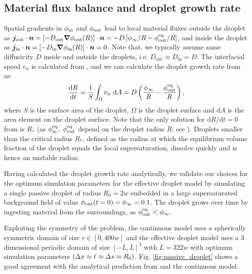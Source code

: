 \subsection{Material flux balance and droplet growth rate}

Spatial gradients in $\phi_\mathrm{in}$ and $\phi_\mathrm{out}$ lead to local material fluxes outside the droplet as $\boldsymbol{j}_\mathrm{out} \cdot \boldsymbol{n} = [-D_\mathrm{out} {\boldsymbol{\nabla}} \phi_\mathrm{out} (R)] \cdot \boldsymbol{n} = -D \left[ \phi_{\infty}/R  - \phi^\mathrm{eq}_\mathrm{out} / R \right]$, and inside the droplet as $\boldsymbol{j}_\mathrm{in} \cdot \boldsymbol{n} = [-D_\mathrm{in} {\boldsymbol{\nabla}} \phi_\mathrm{in} (R)] \cdot \boldsymbol{n} = 0$.
Note that, we typically assume same diffusivity $D$ inside and outside the droplets, i.e. $D_\mathrm{out} \approx D_\mathrm{in} = D$.
The interfacial speed $v_n$ is calculated from
, and we can calculate the droplet growth rate from  as:
\begin{equation}
	\label{eqn:interfacefluxes_passive}
	\frac{\mathrm{d} R}{\mathrm{d} t} = \frac{1}{S} \int_{\Omega} v_n ~ \mathrm{d}A = D\left ( \frac{\phi_{\infty}}{R}  - \frac{\phi^\mathrm{eq}_\mathrm{out}}{R} \right ),
\end{equation}
where $S$ is the surface area of the droplet, $\Omega$ is the droplet surface and $\mathrm{d} A$ is the area element on the droplet surface.
Note that the only solution for ${\mathrm{d} R}/{\mathrm{d} t} = 0$ from  is $R_{\ast}$ (as $\phi^\mathrm{eq}_\mathrm{in},~\phi^\mathrm{eq}_\mathrm{out}$ depend on the droplet radius $R$; see ). Droplets smaller than the critical radius $R_{\ast}$, defined as the radius at which the equilibrium volume fraction of the droplet equals the local supersaturation, dissolve quickly and is hence an unstable radius.

Having calculated the droplet growth rate analytically, we validate our choices for the optimum simulation parameters for the effective droplet model by simulating a single passive droplet of radius $R_0 = 2w$ embedded in a large supersaturated background field of value $\phi_\mathrm{out}(t = 0) = \phi_\infty = 0.1$.
The droplet grows over time by ingesting material from the surroundings, as $\phi^\mathrm{eq}_\mathrm{out} < \phi_\infty$.

Exploiting the symmetry of the problem, the continuous model uses a spherically symmetric domain of size $r \in [0, 400 w]$ and the effective droplet model uses a 3 dimensional periodic domain of size $[-L, L]^3$ with $L = 322 w$ with optimum simulation parameters $(\Delta x \approx \ell \approx \Delta s \approx R_0)$. Fig. \ref{fig:passive_droplet} shows a good agreement with the analytical prediction from  and the continuous model.

